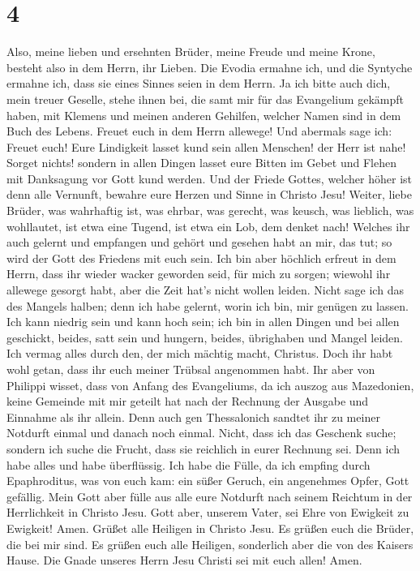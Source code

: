 \hypertarget{section-3}{%
\section{4}\label{section-3}}

 Also, meine lieben und ersehnten Brüder, meine Freude und
meine Krone, besteht also in dem Herrn, ihr Lieben.  Die
Evodia ermahne ich, und die Syntyche ermahne ich, dass sie eines Sinnes
seien in dem Herrn.  Ja ich bitte auch dich, mein treuer
Geselle, stehe ihnen bei, die samt mir für das Evangelium gekämpft
haben, mit Klemens und meinen anderen Gehilfen, welcher Namen sind in
dem Buch des Lebens.  Freuet euch in dem Herrn allewege!
Und abermals sage ich: Freuet euch!  Eure Lindigkeit
lasset kund sein allen Menschen! der Herr ist nahe! 
Sorget nichts! sondern in allen Dingen lasset eure Bitten im Gebet und
Flehen mit Danksagung vor Gott kund werden.  Und der
Friede Gottes, welcher höher ist denn alle Vernunft, bewahre eure Herzen
und Sinne in Christo Jesu!  Weiter, liebe Brüder, was
wahrhaftig ist, was ehrbar, was gerecht, was keusch, was lieblich, was
wohllautet, ist etwa eine Tugend, ist etwa ein Lob, dem denket nach!
 Welches ihr auch gelernt und empfangen und gehört und
gesehen habt an mir, das tut; so wird der Gott des Friedens mit euch
sein.  Ich bin aber höchlich erfreut in dem Herrn, dass
ihr wieder wacker geworden seid, für mich zu sorgen; wiewohl ihr
allewege gesorgt habt, aber die Zeit hat's nicht wollen leiden.
 Nicht sage ich das des Mangels halben; denn ich habe
gelernt, worin ich bin, mir genügen zu lassen.  Ich kann
niedrig sein und kann hoch sein; ich bin in allen Dingen und bei allen
geschickt, beides, satt sein und hungern, beides, übrighaben und Mangel
leiden.  Ich vermag alles durch den, der mich mächtig
macht, Christus.  Doch ihr habt wohl getan, dass ihr euch
meiner Trübsal angenommen habt.  Ihr aber von Philippi
wisset, dass von Anfang des Evangeliums, da ich auszog aus Mazedonien,
keine Gemeinde mit mir geteilt hat nach der Rechnung der Ausgabe und
Einnahme als ihr allein.  Denn auch gen Thessalonich
sandtet ihr zu meiner Notdurft einmal und danach noch einmal.
 Nicht, dass ich das Geschenk suche; sondern ich suche
die Frucht, dass sie reichlich in eurer Rechnung sei. 
Denn ich habe alles und habe überflüssig. Ich habe die Fülle, da ich
empfing durch Epaphroditus, was von euch kam: ein süßer Geruch, ein
angenehmes Opfer, Gott gefällig.  Mein Gott aber fülle
aus alle eure Notdurft nach seinem Reichtum in der Herrlichkeit in
Christo Jesu.  Gott aber, unserem Vater, sei Ehre von
Ewigkeit zu Ewigkeit! Amen.  Grüßet alle Heiligen in
Christo Jesu. Es grüßen euch die Brüder, die bei mir sind.
 Es grüßen euch alle Heiligen, sonderlich aber die von
des Kaisers Hause.  Die Gnade unseres Herrn Jesu Christi
sei mit euch allen! Amen.
